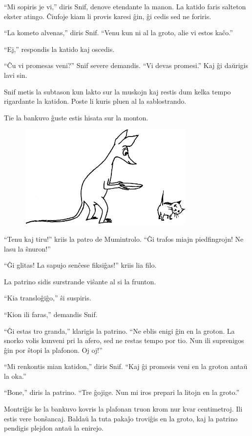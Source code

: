``Mi sopiris je vi,'' diris Snif, denove etendante la manon. La katido faris salteton ekster atingo. Ĉiufoje kiam li provis karesi ĝin, ĝi cedis sed ne foriris.

``La kometo alvenas,'' diris Snif. ``Venu kun ni al la groto, alie vi estos kaĉo.''

``Ej,'' respondis la katido kaj oscedis.

``Ĉu vi promesas veni?'' Snif severe demandis. ``Vi devas promesi.'' Kaj ĝi daŭrigis lavi sin.

Snif metis la subtason kun lakto sur la muskojn kaj restis dum kelka tempo rigardante la katidon. Poste li kuris pluen al la sablostrando.

Tie la bankuvo ĝuste estis hisata sur la monton.

\begin{figure}[htbp]
\centering
\includegraphics[width=250pt,height=147pt]{9-5.png}
\caption{}
\label{9-5}
\end{figure}

``Tenu kaj tiru!'' kriis la patro de Mumintrolo. ``Ĝi trafos miajn piedfingrojn! Ne lasu la ŝnuron!''

``Ĝi glitas! La sapujo senĉese fiksiĝas!'' kriis lia filo.

La patrino sidis surstrande viŝante al si la frunton.

``Kia transloĝiĝo,'' ŝi suspiris.

``Kion ili faras,'' demandis Snif.

``Ĝi estas tro granda,'' klarigis la patrino. ``Ne eblis enigi ĝin en la groton. La snorko volis kunveni pri la afero, sed ne restas tempo por tio. Nun ili suprenigos ĝin por ŝtopi la plafonon. Oj oj!''

``Mi renkontis mian katidon,'' diris Snif. ``Kaj ĝi promesis veni en la groton antaŭ la oka.''

``Bone,'' diris la patrino. ``Tre ĝojige. Nun mi iros prepari la litojn en la groto.''

Montriĝis ke la bankuvo kovris la plafonan truon krom nur kvar centimetroj. Ili estis vere bonŝancaj. Baldaŭ la tuta pakaĵo troviĝis en la groto, kaj la patrino pendigis plejdon antaŭ la enirejo.

